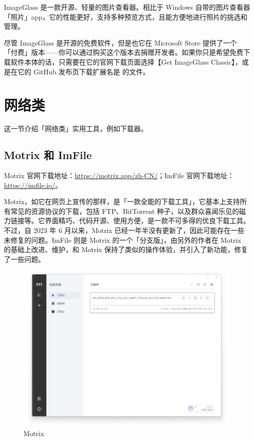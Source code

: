 ImageGlass 是一款开源、轻量的图片查看器。相比于 Windows 自带的图片查看器「照片」app，它的性能更好，支持多种预览方式，且能方便地进行照片的挑选和管理。

尽管 ImageGlass 是开源的免费软件，但是也它在 Microsoft Store 提供了一个「付费」版本——你可以通过购买这个版本去捐赠开发者。如果你只是希望免费下载软件本体的话，只需要在它的官网下载页面选择【Get ImageGlass Classic】，或是在它的 GitHub 发布页下载扩展名是  的文件。

\section{网络类}

这一节介绍「网络类」实用工具，例如下载器。

\subsection{Motrix 和 ImFile}

Motrix 官网下载地址：\url{https://motrix.app/zh-CN/}；ImFile 官网下载地址：\url{https://imfile.io/}。

Motrix，如它在网页上宣传的那样，是「一款全能的下载工具」，它基本上支持所有常见的资源协议的下载，包括 FTP、BitTorrent 种子，以及群众喜闻乐见的磁力链接等。它界面精巧、代码开源、使用方便，是一款不可多得的优良下载工具。不过，自 2023 年 6 月以来，Motrix 已经一年半没有更新了，因此可能存在一些未修复的问题。ImFile 则是 Motrix 的一个「分支版」，由另外的作者在 Motrix 的基础上改进、维护，和 Motrix 保持了类似的操作体验，并引入了新功能，修复了一些问题。

\begin{figure}[htb!]
  \centering
  \includegraphics[width=.6\textwidth]{assets/software/Motrix.png}
  \caption{Motrix}
  \label{fig:Motrix}
\end{figure}

